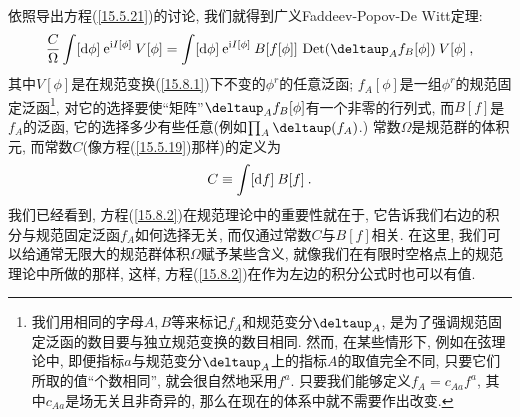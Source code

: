依照导出方程(\ref{15.5.21})的讨论, 我们就得到广义Faddeev-Popov-De Witt定理:%
\begin{equation}
\frac{C}{\Omega }\int [\dif\phi ]\:\me^{\mi I[\phi ]}\:V[\phi ]=\int [\dif\phi ]%
\:\me^{\mi I[\phi ]}\:B[f[\phi ]]\, \operatorname{Det} (\deltaup_{A}f_{B}[\phi ])\:V[\phi ]\:,  \label{15.8.2}
\end{equation}%
其中$V[\phi ]$是在规范变换(\ref{15.8.1})下不变的$\phi^{r}$的任意泛函; $f_{A}[\phi ]$是一组$\phi ^{r}$的规范固定泛函\footnote{%
我们用相同的字母$A,B$等来标记$f_{A}$和规范变分$\deltaup_{A}$, 是为了强调规范固定泛函的数目要与独立规范变换的数目相同. 然而, 在某些情形下, 例如在弦理论中, 
即便指标$a$与规范变分$\deltaup_{A}$上的指标$A$的取值完全不同, 只要它们所取的值``个数相同'', 就会很自然地采用$f^{a}$. 只要我们能够定义$f_{A}=c_{Aa}f^{a}$, 
其中$c_{Aa}$是场无关且非奇异的, 那么在现在的体系中就不需要作出改变.}, 对它的选择要使``矩阵''$\deltaup_{A}f_{B}[\phi ]$有一个非零的行列式, 
而$B[f]$是$f_{A}$的泛函, 它的选择多少有些任意(例如$\prod_{A}\deltaup(f_{A})$.) 常数$\Omega$是规范群的体积元, 而常数$C$(像方程(\ref{15.5.19})那样)的定义为
\begin{equation}
C\equiv \int [\mathrm{d} f]\:B[f]\:.   \label{15.8.3}
\end{equation}%
我们已经看到, 方程(\ref{15.8.2})在规范理论中的重要性就在于, 它告诉我们右边的积分与规范固定泛函$f_{A}$如何选择无关,
而仅通过常数$C$与$B[f]$相关. 在这里, 我们可以给通常无限大的规范群体积$\Omega $赋予某些含义, 就像我们在有限时空格点上的规范理论中所做的那样, 这样, 
方程(\ref{15.8.2})在作为左边的积分公式时也可以有值.%

